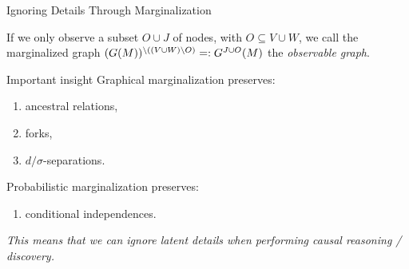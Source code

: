 \begin{frame}{Ignoring Details Through Marginalization}
  \begin{Def}
  If we only observe a subset $O \cup J$ of nodes, with $O \subseteq V \cup W$,
  we call the marginalized graph $(G(M))^{\setminus((V\cup W)\setminus O)} =: G^{J\cup O}(M)$ the \emph{observable graph}.
  \end{Def}

  \begin{block}{Important insight}
  Graphical marginalization preserves:
    \begin{enumerate}
      \item ancestral relations, 
      \item forks, 
      \item $d/\sigma$-separations.
    \end{enumerate}
  Probabilistic marginalization preserves:
    \begin{enumerate}
      \item conditional independences.
    \end{enumerate}
    \emph{This means that we can ignore latent details when performing causal reasoning / discovery.}
  \end{block}
\end{frame}
